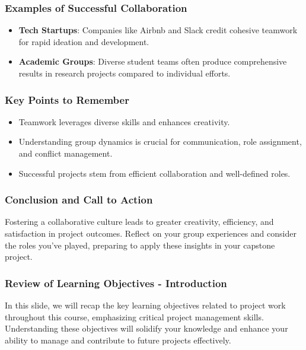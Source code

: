 \documentclass[aspectratio=169]{beamer}
\begin{document}
\begin{frame}[fragile]
    \frametitle{Examples of Successful Collaboration}
    \begin{itemize}
        \item \textbf{Tech Startups}: Companies like Airbnb and Slack credit cohesive teamwork for rapid ideation and development.
        \item \textbf{Academic Groups}: Diverse student teams often produce comprehensive results in research projects compared to individual efforts.
    \end{itemize}
\end{frame}

\begin{frame}[fragile]
    \frametitle{Key Points to Remember}
    \begin{itemize}
        \item Teamwork leverages diverse skills and enhances creativity.
        \item Understanding group dynamics is crucial for communication, role assignment, and conflict management.
        \item Successful projects stem from efficient collaboration and well-defined roles.
    \end{itemize}
\end{frame}

\begin{frame}[fragile]
    \frametitle{Conclusion and Call to Action}
    Fostering a collaborative culture leads to greater creativity, efficiency, and satisfaction in project outcomes. Reflect on your group experiences and consider the roles you’ve played, preparing to apply these insights in your capstone project.
\end{frame}

\begin{frame}[fragile]
    \frametitle{Review of Learning Objectives - Introduction}
    In this slide, we will recap the key learning objectives related to project work throughout this course, emphasizing critical project management skills.
    Understanding these objectives will solidify your knowledge and enhance your ability to manage and contribute to future projects effectively.
\end{frame}
\end{document}
